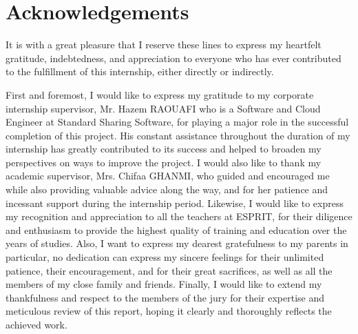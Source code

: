 \chapter*{Acknowledgements}
\par It is with a great pleasure that I reserve these lines to express my heartfelt gratitude, indebtedness, and appreciation to everyone who has ever contributed to the fulfillment of this internship, either directly or indirectly.\newline
\par First and foremost, I would like to express my gratitude to my corporate internship supervisor, Mr. Hazem RAOUAFI who is a Software and Cloud Engineer at Standard Sharing Software, for playing a major role in the successful completion of this project. His constant assistance throughout the duration of my internship has greatly contributed to its success and helped to broaden my perspectives on ways to improve the project.
\bigskip\newline I would also like to thank my academic supervisor, Mrs. Chifaa GHANMI, who guided and encouraged me while also providing valuable advice along the way, and for her patience and incessant support during the internship period.
\bigskip\newline Likewise, I would like to express my recognition and appreciation to all the teachers at ESPRIT, for their diligence and enthusiasm to provide the highest quality of training and education over the years of studies.
\bigskip\newline Also, I want to express my dearest gratefulness to my parents in particular, no dedication can express my sincere feelings for their unlimited patience, their encouragement, and for their great sacrifices, as well as all the members of my close family and friends.
\bigskip\newline Finally, I would like to extend my thankfulness and respect to the members of the jury for their expertise and meticulous review of this report, hoping it clearly and thoroughly reflects the achieved work.